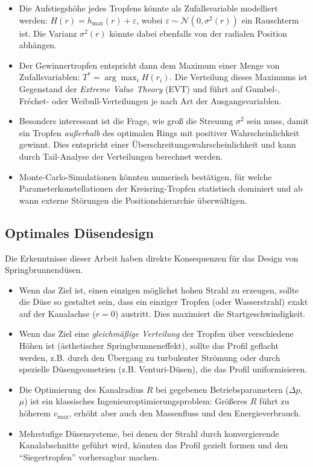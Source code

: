 ﻿\documentclass[a4paper,12pt]{article}
\theoremstyle{definition}
\begin{document}
\begin{itemize}
    \item Die Aufstiegshöhe jedes Tropfens könnte als Zufallsvariable modelliert werden:
          $H(r) = h_{\max}(r) + \varepsilon$, wobei $\varepsilon \sim \mathcal{N}(0, \sigma^2(r))$
          ein Rauschterm ist. Die Varianz $\sigma^2(r)$ könnte dabei ebenfalls von der
          radialen Position abhängen.
    \item Der Gewinnertropfen entspricht dann dem Maximum einer Menge von Zufallsvariablen:
          $T^* = \arg\max_i H(r_i)$. Die Verteilung dieses Maximums ist Gegenstand der
          \emph{Extreme Value Theory} (EVT) und führt auf Gumbel-, Fréchet- oder
          Weibull-Verteilungen je nach Art der Ausgangsvariablen.
    \item Besonders interessant ist die Frage, wie groß die Streuung $\sigma^2$ sein muss,
          damit ein Tropfen \emph{außerhalb} des optimalen Rings mit positiver Wahrscheinlichkeit
          gewinnt. Dies entspricht einer Überschreitungswahrscheinlichkeit und kann durch
          Tail-Analyse der Verteilungen berechnet werden.
    \item Monte-Carlo-Simulationen könnten numerisch bestätigen, für welche Parameterkonstellationen
          der Kreisring-Tropfen statistisch dominiert und ab wann externe Störungen die
          Positionshierarchie überwältigen.
\end{itemize}

\subsection{Optimales Düsendesign}

Die Erkenntnisse dieser Arbeit haben direkte Konsequenzen für das Design von Springbrunnen\-düsen.

\begin{itemize}
    \item Wenn das Ziel ist, einen einzigen möglichst hohen Strahl zu erzeugen, sollte
          die Düse so gestaltet sein, dass ein einziger Tropfen (oder Wasserstrahl) exakt auf
          der Kanalachse ($r = 0$) austritt. Dies maximiert die Startgeschwindigkeit.
    \item Wenn das Ziel eine \emph{gleichmäßige Verteilung} der Tropfen über verschiedene
          Höhen ist (ästhetischer Springbrunneneffekt), sollte das Profil geflacht werden,
          z.B. durch den Übergang zu turbulenter Strömung oder durch spezielle Düsengeometrien
          (z.B. Venturi-Düsen), die das Profil uniformisieren.
    \item Die Optimierung des Kanalradius $R$ bei gegebenen Betriebsparametern
          ($\Delta p$, $\mu$) ist ein klassisches Ingenieuroptimierungsproblem:
          Größeres $R$ führt zu höherem $v_{\max}$, erhöht aber auch den Massenfluss und
          den Energieverbrauch.
    \item Mehrstufige Düsensysteme, bei denen der Strahl durch konvergierende Kanalabschnitte
          geführt wird, könnten das Profil gezielt formen und den ``Siegertropfen'' vorhersagbar
          machen.
\end{itemize}
\end{document}
